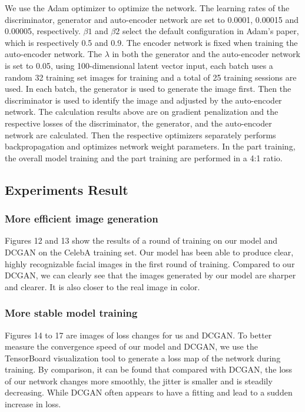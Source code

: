 We use the Adam optimizer to optimize the network.
The learning rates of the discriminator, generator and auto-encoder network are set to 0.0001, 0.00015 and 0.00005, respectively.
$\beta1$ and $\beta2$ select the default configuration in Adam's paper, which is respectively 0.5 and 0.9.
The encoder network is fixed when training the auto-encoder network.
The $\lambda$ in both the generator and the auto-encoder network is set to 0.05, using 100-dimensional latent vector input, each batch uses a random 32 training set images for training and a total of 25 training sessions are used.
In each batch, the generator is used to generate the image first.
Then the discriminator is used to identify the image and adjusted by the auto-encoder network.
The calculation results above are on gradient penalization and the respective losses of the discriminator, the generator, and the auto-encoder network are calculated.
Then the respective optimizers separately performs backpropagation and optimizes network weight parameters.
In the part training, the overall model training and the part training are performed in a 4:1 ratio.

\subsection{Experiments Result}
\subsubsection*{More efficient image generation} 
Figures 12 and 13 show the results of a round of training on our model and DCGAN on the CelebA training set.
Our model has been able to produce clear, highly recognizable facial images in the first round of training.
Compared to our DCGAN, we can clearly see that the images generated by our model are sharper and clearer.
It is also closer to the real image in color.

\subsubsection*{More stable model training}
Figures 14 to 17 are images of loss changes for us and DCGAN.
To better measure the convergence speed of our model and DCGAN, we use the TensorBoard visualization tool to generate a loss map of the network during training.
By comparison, it can be found that compared with DCGAN, the loss of our network changes more smoothly, the jitter is smaller and is steadily decreasing.
While DCGAN often appears to have a fitting and lead to a sudden increase in loss.

